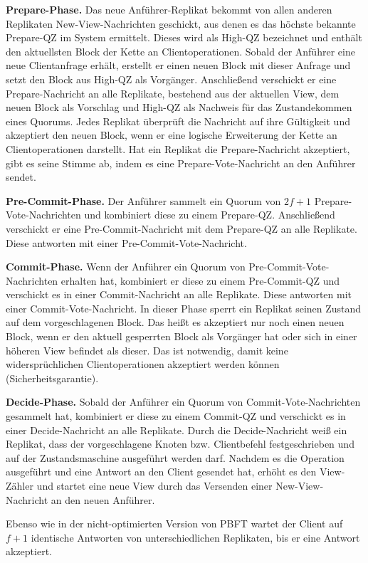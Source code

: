 \documentclass[nonacm,sigconf,natbib=false]{acmart}
\begin{document}
\textbf{Prepare-Phase.} Das neue Anführer-Replikat bekommt von allen anderen Replikaten New-View-Nachrichten geschickt, aus denen es das höchste bekannte Prepare-QZ im System ermittelt. Dieses wird als High-QZ bezeichnet und enthält den aktuellsten Block der Kette an Clientoperationen. Sobald der Anführer eine neue Clientanfrage erhält, erstellt er einen neuen Block mit dieser Anfrage und setzt den Block aus High-QZ als Vorgänger. Anschließend verschickt er eine Prepare-Nachricht an alle Replikate, bestehend aus der aktuellen View, dem neuen Block als Vorschlag und High-QZ als Nachweis für das Zustandekommen eines Quorums. Jedes Replikat überprüft die Nachricht auf ihre Gültigkeit und akzeptiert den neuen Block, wenn er eine logische Erweiterung der Kette an Clientoperationen darstellt. Hat ein Replikat die Prepare-Nachricht akzeptiert, gibt es seine Stimme ab, indem es eine Prepare-Vote-Nachricht an den Anführer sendet.

\textbf{Pre-Commit-Phase.} Der Anführer sammelt ein Quorum von $2f+1$ Prepare-Vote-Nachrichten und kombiniert diese zu einem Prepare-QZ. Anschließend verschickt er eine Pre-Commit-Nachricht mit dem Prepare-QZ an alle Replikate. Diese antworten mit einer Pre-Commit-Vote-Nachricht.

\textbf{Commit-Phase.} Wenn der Anführer ein Quorum von Pre-Commit-Vote-Nachrichten erhalten hat, kombiniert er diese zu einem Pre-Commit-QZ und verschickt es in einer Commit-Nachricht an alle Replikate. Diese antworten mit einer Commit-Vote-Nachricht. In dieser Phase sperrt ein Replikat seinen Zustand auf dem vorgeschlagenen Block. Das heißt es akzeptiert nur noch einen neuen Block, wenn er den aktuell gesperrten Block als Vorgänger hat oder sich in einer höheren View befindet als dieser. Das ist notwendig, damit keine widersprüchlichen Clientoperationen akzeptiert werden können (Sicherheitsgarantie).

\textbf{Decide-Phase.} Sobald der Anführer ein Quorum von Commit-Vote-Nachrichten gesammelt hat, kombiniert er diese zu einem Commit-QZ und verschickt es in einer Decide-Nachricht an alle Replikate. Durch die Decide-Nachricht weiß ein Replikat, dass der vorgeschlagene Knoten bzw. Clientbefehl festgeschrieben und auf der Zustandsmaschine ausgeführt werden darf. Nachdem es die Operation ausgeführt und eine Antwort an den Client gesendet hat, erhöht es den View-Zähler und startet eine neue View durch das Versenden einer New-View-Nachricht an den neuen Anführer.

Ebenso wie in der nicht-optimierten Version von PBFT wartet der Client auf $f+1$ identische Antworten von unterschiedlichen Replikaten, bis er eine Antwort akzeptiert.
\end{document}
